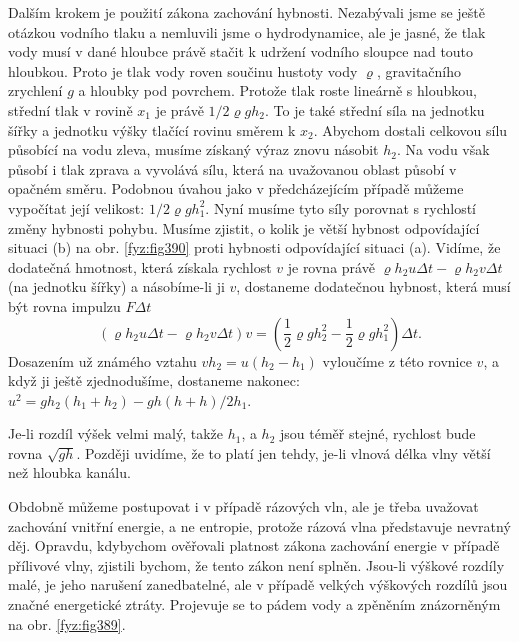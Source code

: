   Dalším krokem je použití zákona zachování hybnosti. Nezabývali jsme se ještě otázkou vodního 
  tlaku a nemluvili jsme o hydrodynamice, ale je jasné, že tlak vody musí v dané hloubce právě 
  stačit k udržení vodního sloupce nad touto hloubkou. Proto je tlak vody roven součinu hustoty 
  vody \(\varrho\), gravitačního zrychlení \(g\) a hloubky pod povrchem. Protože tlak roste 
  lineárně s hloubkou, střední tlak v rovině \(x_1\) je právě \(1/2\varrho gh_2\). To je také 
  střední síla na jednotku šířky a jednotku výšky tlačící rovinu směrem k \(x_2\). Abychom dostali 
  celkovou sílu působící na vodu zleva, musíme získaný výraz znovu násobit \(h_2\). Na vodu však 
  působí i tlak zprava a vyvolává sílu, která na uvažovanou oblast působí v opačném směru. Podobnou 
  úvahou jako v předcházejícím případě můžeme vypočítat její velikost: \(1/2\varrho gh_1^2\). Nyní 
  musíme tyto síly porovnat s rychlostí změny hybnosti pohybu. Musíme zjistit, o kolik je větší 
  hybnost odpovídající situaci (b) na obr. \ref{fyz:fig390} proti hybnosti odpovídající situaci 
  (a). Vidíme, že dodatečná hmotnost, která získala rychlost \(v\) je rovna právě \(\varrho 
  h_2u\Delta t - \varrho h_2v\Delta t\) (na jednotku šířky) a násobíme-li ji \(v\), dostaneme 
  dodatečnou hybnost, která musí být rovna impulzu \(F\Delta t\)
  \begin{equation*}
    (\varrho h_2u\Delta t - \varrho h_2v\Delta t) v
      = \left(\dfrac{1}{2}\varrho g h_2^2 - \dfrac{1}{2}\varrho g h_1^2\right)\Delta t.
  \end{equation*}
  Dosazením už známého vztahu \(vh_2 = u(h_2 - h_1)\) vyloučíme z této rovnice \(v\), a když ji 
  ještě zjednodušíme, dostaneme nakonec: \(u^2 = gh_2(h_1 + h_2)-gh (h+h)/2 h_1\).
  
  Je-li rozdíl výšek velmi malý, takže \(h_1\), a \(h_2\) jsou téměř stejné, rychlost bude rovna 
  \(\sqrt{gh}\). Později uvidíme, že to platí jen tehdy, je-li vlnová délka vlny větší než hloubka 
  kanálu.
  
  Obdobně můžeme postupovat i v případě rázových vln, ale je třeba uvažovat zachování vnitřní 
  energie, a ne entropie, protože rázová vlna představuje nevratný děj. Opravdu, kdybychom 
  ověřovali platnost zákona zachování energie v případě přílivové vlny, zjistili bychom, že tento 
  zákon není splněn. Jsou-li výškové rozdíly malé, je jeho narušení zanedbatelné, ale v případě 
  velkých výškových rozdílů jsou značné energetické ztráty. Projevuje se to pádem vody a zpěněním 
  znázorněným na obr. \ref{fyz:fig389}.
  
